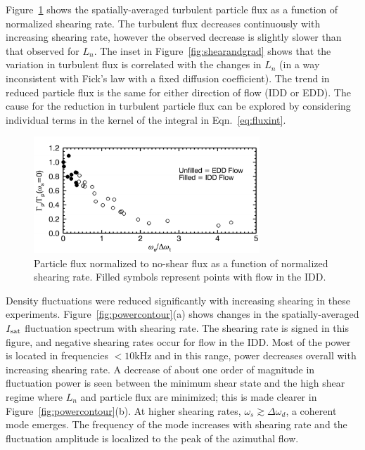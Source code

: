 \documentclass[aps,prl,amsmath,amssymb,preprint,superscriptaddress]{revtex4}
\begin{document}
Figure~\ref{fig:fluxvsshear} shows the spatially-averaged turbulent
particle flux as a function of normalized shearing rate.  The
turbulent flux decreases continuously with increasing shearing rate,
however the observed decrease is slightly slower than that observed
for $L_n$.  The inset in Figure~\ref{fig:shearandgrad} shows that the variation in
turbulent flux is correlated with the changes in $L_n$ (in a way
inconsistent with Fick's law with a fixed diffusion coefficient).  The
trend in reduced particle flux is the same for either direction of
flow (IDD or EDD).  The cause for the reduction in turbulent particle
flux can be explored by considering individual terms in the kernel of
the integral in Eqn.~\ref{eq:fluxint}.


\begin{figure}[!htbp]
\centerline{
\includegraphics[width=8.5cm]{fluxvsshear.pdf}}
\caption{\label{fig:fluxvsshear} Particle flux normalized to no-shear
  flux as a function of normalized shearing rate. Filled symbols
  represent points with flow in the IDD.}
\end{figure}


Density fluctuations were reduced significantly with increasing
shearing in these experiments.  Figure~\ref{fig:powercontour}(a) shows
changes in the spatially-averaged $I_{\rm sat}$ fluctuation spectrum
with shearing rate.  The shearing rate is signed in this figure, and
negative shearing rates occur for flow in the IDD. Most of the power
is located in frequencies $<10$kHz and in this range, power decreases
overall with increasing shearing rate.  A decrease of about one order
of magnitude in fluctuation power is seen between the minimum shear
state and the high shear regime where $L_n$ and particle flux are
minimized; this is made clearer in Figure~\ref{fig:powercontour}(b).  At
higher shearing rates, $\omega_s \gtrsim \Delta \omega_d$, a coherent
mode emerges.  The frequency of the mode increases with shearing rate
and the fluctuation amplitude is localized to the peak of the
azimuthal flow.
\end{document}
